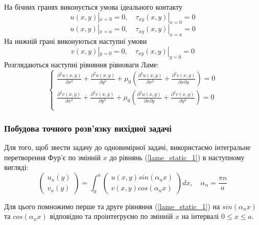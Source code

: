 На бічних гранях виконується умова ідеального контакту
\begin{equation}\label{bound_1_static_1}
    u(x,y) |_{x=0} = 0, \quad \tau_{xy}(x,y) |_{x=0} =0
\end{equation}
\begin{equation}\label{bound_2_static_1}
    u(x,y) |_{x=a} = 0, \quad \tau_{xy}(x,y) |_{x=a} =0
\end{equation}
На нижній грані виконуються наступні умови
\begin{equation}
    v(x,y) |_{y=0} = 0, \quad \tau_{xy}(x,y) |_{y=0} =0
\end{equation}
Розглядаються наступні рівняння рівноваги Ламе:
\begin{equation}\label{lame_static_1}
    \begin{cases}
        \frac{\partial^2 u(x,y)}{\partial x^2} + \frac{\partial^2 u(x,y)}{\partial y^2} + \mu_0 (\frac{\partial^2 u(x,y)}{\partial x^2} + \frac{\partial^2 v(x,y)}{\partial x\partial y}) = 0 \\
        \frac{\partial^2 v(x,y)}{\partial x^2} + \frac{\partial^2 v(x,y)}{\partial y^2} + \mu_0 (\frac{\partial^2 u(x,y)}{\partial x \partial y} + \frac{\partial^2 v(x,y)}{\partial y^2}) = 0 \\
    \end{cases}
\end{equation}

\subsubsection{Побудова точного розв'язку вихідної задачі}
Для того, щоб звести задачу до одновимірної задачі, використаємо інтегральне перетворення Фур'є по змінній $x$ до рівнянь (\ref{lame_static_1}) в наступному вигляді:
\begin{equation}
    \begin{pmatrix}
        u_n(y) \\
        v_n(y)
    \end{pmatrix} = \int_{0}^{a} 
    \begin{pmatrix}
        u(x,y) sin(\alpha_n x) \\
        v(x,y) cos(\alpha_n x)
    \end{pmatrix} dx, \quad \alpha_n = \frac{\pi n}{a}
\end{equation}

Для цього помножимо перше та друге рівняння (\ref{lame_static_1}) на $sin(\alpha_n x)$ та $cos(\alpha_n x)$ відповідно та проінтегруємо по змінній $x$ на інтервалі $0 \le x \le a$.

